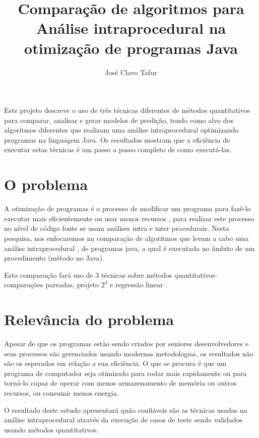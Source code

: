 \documentclass[12pt]{article}
\title{Comparação de algoritmos para Análise intraprocedural na otimização de programas Java}
\author{José Clavo Tafur\inst{1} }
\begin{document}
 

\maketitle

\begin{resumo} 
Este projeto descreve o uso de três técnicas diferentes de métodos quantitativos para comparar, analisar e gerar modelos de predição, tendo como alvo dos algoritmos diferentes que realizam uma análise intraprocedural optimizando programas na linguagem Java.
Os resultados mostram que a eficiência de executar estas técnicas é um passo a passo completo de como executá-las. 
\end{resumo}

\section{O problema}

A otimização de programas é o processo de modificar um programa para fazê-lo executar mais eficientemente ou  usar menos recursos \cite{program_analysis}, para realizar este processo no nível de código fonte se usam análises intra e inter procedurais. Nesta pesquisa, nos enfocaremos na comparação de algoritmos que levam a cabo uma análise intraprocedural \cite{soot_book}, de programas java, a qual é executada no âmbito de um procedimento (método no Java).

Esta comparação fará uso de 3 técnicas sobre métodos quantitativos: comparações pareadas, projeto ${2^3}$ e regressão linear \cite{method_quantitative}.


\section{Relevância do problema}

Apesar de que os programas estão sendo criados por seniores desenvolvedores e seus processos são gerenciados usando modernas metodologias, os resultados não são os esperados em relação a sua eficiência. O que se procura é que um programa de computador seja otimizado para rodar mais rapidamente ou para torná-lo capaz de operar com menos armazenamento de memória ou outros recursos, ou consumir menos energia.

O resultado deste estudo apresentará quão confiáveis são as técnicas usadas na análise intraprocedural através da execução de casos de teste sendo validados usando métodos quantitativos.
\end{document}
